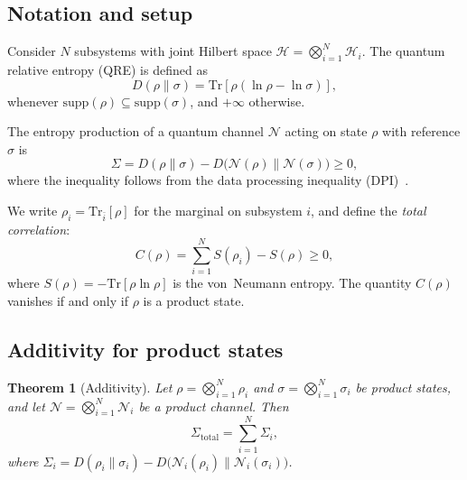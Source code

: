 \documentclass[letterpaper,twocolumn,superscriptaddress,longbibliography]{revtex4-2}
\newtheorem{theorem}{Theorem}[section]
\newcommand{\Tr}{\mathrm{Tr}}
\newcommand{\chan}{\mathcal{N}}
\newcommand{\hilb}{\mathcal{H}}
\begin{document}
\subsection{Notation and setup}
\label{sec:S1_setup}

Consider $N$ subsystems with joint Hilbert space
$\hilb = \bigotimes_{i=1}^{N} \hilb_i$.
The quantum relative entropy (QRE) is defined as~\cite{Umegaki1962}
\begin{equation}
  D(\rho \| \sigma) = \Tr[\rho(\ln\rho - \ln\sigma)],
  \label{eq:QRE_def}
\end{equation}
whenever $\mathrm{supp}(\rho) \subseteq \mathrm{supp}(\sigma)$,
and $+\infty$ otherwise.

The entropy production of a quantum channel $\chan$ acting on
state $\rho$ with reference $\sigma$ is
\begin{equation}
  \Sigma = D(\rho \| \sigma) - D\bigl(\chan(\rho) \| \chan(\sigma)\bigr)
         \geq 0,
  \label{eq:Sigma_def}
\end{equation}
where the inequality follows from the data processing inequality
(DPI)~\cite{Lindblad1975}.

We write $\rho_i = \Tr_{\bar{i}}[\rho]$ for the marginal on
subsystem $i$, and define the \emph{total correlation}:
\begin{equation}
  C(\rho) = \sum_{i=1}^{N} S(\rho_i) - S(\rho) \geq 0,
  \label{eq:total_corr}
\end{equation}
where $S(\rho) = -\Tr[\rho \ln \rho]$ is the von~Neumann entropy.
The quantity $C(\rho)$ vanishes if and only if $\rho$ is a product
state.

\subsection{Additivity for product states}

\begin{theorem}[Additivity]
\label{thm:additivity}
Let $\rho = \bigotimes_{i=1}^{N} \rho_i$ and
$\sigma = \bigotimes_{i=1}^{N} \sigma_i$ be product states,
and let $\chan = \bigotimes_{i=1}^{N} \chan_i$ be a product channel.
Then
\begin{equation}
  \Sigma_{\mathrm{total}}
  = \sum_{i=1}^{N} \Sigma_i,
  \label{eq:additivity}
\end{equation}
where $\Sigma_i = D(\rho_i \| \sigma_i) -
D\bigl(\chan_i(\rho_i) \| \chan_i(\sigma_i)\bigr)$.
\end{theorem}
\end{document}
